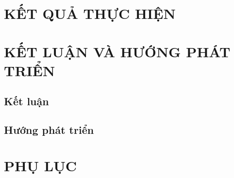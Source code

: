 \documentclass[12pt, a4paper, oneside]{article}
\begin{document}
\section{KẾT QUẢ THỰC HIỆN}
\label{sec:ket_qua_thuc_hien}




\newpage
\section{KẾT LUẬN VÀ HƯỚNG PHÁT TRIỂN}
\label{sec:ket_luan}


\subsection{Kết luận}

\subsection{Hướng phát triển}

\newpage
\nocite{*}
\printbibliography[title={\centering TÀI LIỆU THAM KHẢO}, heading=bibintoc]
\newpage
\section*{PHỤ LỤC}


\end{document}
